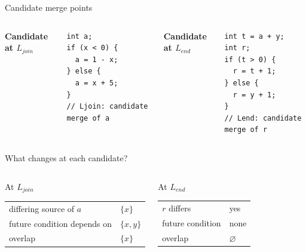 \documentclass[english,aspectratio=169,t]{beamer}
\begin{document}
\begin{frame}[fragile]{Candidate merge points}
  \begin{minipage}[t][0.38\textheight][t]{\textwidth}
  \begin{columns}[T,onlytextwidth]
      \textbf{Candidate at $L_{join}$}\par\vspace{-0.3em}
      \begin{lstlisting}[style=cppcode,basicstyle=\ttfamily\fontsize{5.3}{5.85}\selectfont]
int a;
if (x < 0) {
  a = 1 - x;
} else {
  a = x + 5;
}
// Ljoin: candidate merge of a
      \end{lstlisting}
      \textbf{Candidate at $L_{end}$}\par\vspace{-0.3em}
      \begin{lstlisting}[style=cppcode,basicstyle=\ttfamily\fontsize{5.3}{5.85}\selectfont]
int t = a + y;
int r;
if (t > 0) {
  r = t + 1;
} else {
  r = y + 1;
}
// Lend: candidate merge of r
      \end{lstlisting}
  \end{columns}
  \end{minipage}
  \vspace{0.10em}
  \futuredependencysection
\end{frame}






\begin{frame}{What changes at each candidate?}
  \begin{minipage}[t][0.38\textheight][t]{\textwidth}
  \begin{columns}[T,onlytextwidth]
      \begin{block}{At $L_{join}$}
        \begin{tabular}{@{}ll@{}}
          differing source of $a$ & $\{x\}$\\
          future condition depends on & $\{x,y\}$\\
          overlap & $\{x\}$
        \end{tabular}
      \end{block}
      \begin{block}{At $L_{end}$}
        \begin{tabular}{@{}ll@{}}
          $r$ differs & yes\\
          future condition & none\\
          overlap & $\varnothing$
        \end{tabular}
      \end{block}
  \end{columns}
  \end{minipage}
  \vspace{0.10em}
  \futuredependencysection
\end{frame}
\end{document}
